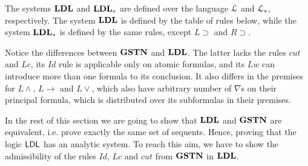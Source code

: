 The systems $\mathbf{LDL}$ and $\mathbf{LDL}_*$ are defined over the language $\mathcal{L}$ and $\mathcal{L}_*$, respectively. The system $\mathbf{LDL}$ is defined by the table of rules below, while the system $\mathbf{LDL}_*$ is defined by the same rules, except $L \supset$ and $R \supset$.


Notice the differences between $\mathbf{GSTN}$ and $\mathbf{LDL}$. The latter lacks the rules $cut$ and $Lc$, its $Id$ rule is applicable only on atomic formulas, and its $Lw$ can introduce more than one formula to its conclusion. It also differs in the premises for $L \wedge$, $L \rightarrow$ and $L \vee$, which also have arbitrary number of $\nabla$s on their principal formula, which is distributed over its subformulas in their premises.

In the rest of this section we are going to show that $\mathbf{LDL}$ and $\mathbf{GSTN}$ are equivalent, i.e. prove exactly the same set of sequents. Hence, proving that the logic $\mathsf{LDL}$ has an analytic system. To reach this aim, we have to show the admissibility of the rules $Id$, $Lc$ and $cut$ from $\mathbf{GSTN}$ in $\mathbf{LDL}$.
